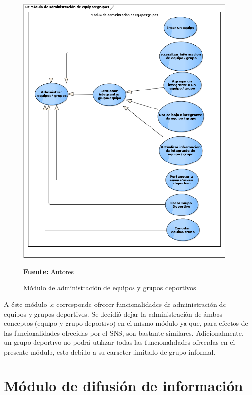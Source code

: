 \begin{figure}[!htb]
  \begin{center}
    \includegraphics[width=11cm]{./imagenes/casos_uso/gestion_equipo_grupo.png}
    \caption{Módulo de administración de equipos y grupos deportivos}
    \label{fig:cu_admin_equip_grup}
    \textbf{Fuente:} Autores
  \end{center}
\end{figure}

A éste módulo le corresponde ofrecer funcionalidades de administración de equipos y grupos deportivos. Se decidió dejar la administración de ámbos conceptos (equipo y grupo deportivo) en el mismo módulo ya que, para efectos de las funcionalidades ofrecidas por el SNS, son bastante similares. Adicionalmente, un grupo deportivo no podrá utilizar todas las funcionalidades ofrecidas en el presente módulo, esto debido a su caracter limitado de grupo informal.

\section{Módulo de difusión de información}



